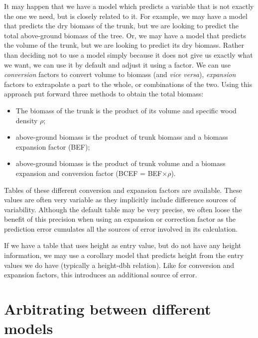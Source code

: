 It may happen that we have a model which predicts a variable that is not exactly the one we need, but is closely related to it. For example, we may have a model that predicts the dry biomass of the trunk, but we are looking to predict the total above-ground biomass of the tree. Or, we may have a model that predicts the volume of the trunk, but we are looking to predict its dry biomass. Rather than deciding not to use a model simply because it does not give us exactly what we want, we can use it by default and adjust it using a factor. We can use 
\emph{conversion} factors to convert volume to biomass (and 
\textit{vice versa}), \emph{expansion} factors to extrapolate a part to the whole, or combinations of the two. Using this approach 
\citet{henry11} put forward three methods to obtain the total biomass:
\begin{itemize}
\item The biomass of the trunk is the product of its volume and specific wood density $\rho$;
\item above-ground biomass is the product of trunk biomass and a biomass expansion factor (BEF);
\item above-ground biomass is the product of trunk volume and a biomass expansion and conversion factor (BCEF = BEF$\times\rho$).
\end{itemize}
Tables of these different conversion and expansion factors are available. These values are often very variable as they implicitly include difference sources of variability. Although the default table may be very precise, we often loose the benefit of this precision when using an expansion or correction factor as the prediction error cumulates all the sources of error involved in its calculation.

If we have a table that uses height as entry value, but do not have any height information, we may use a corollary model that predicts height from the entry values we do have (typically a height-dbh relation). Like for conversion and expansion factors, this introduces an additional source of error.

\section{Arbitrating between different models\label{arbi}}

